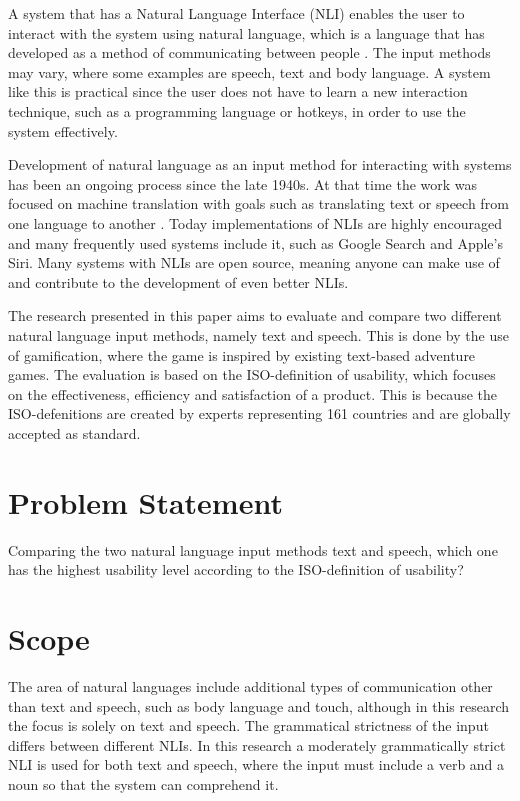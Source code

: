 A system that has a Natural Language Interface (NLI) enables the user to interact with the system using natural language, which is a language that has developed as a method of communicating between people \citep{NatLan}. The input methods may vary, where some examples are speech, text and body language. A system like this is practical since the user does not have to learn a new interaction technique, such as a programming language or hotkeys, in order to use the system effectively.

Development of natural language as an input method for interacting with systems has been an ongoing process since the late 1940s. At that time the work was focused on machine translation with goals such as translating text or speech from one language to another \citep{Jones}. Today implementations of NLIs are highly encouraged and many frequently used systems include it, such as Google Search and Apple's Siri. Many systems with NLIs are open source, meaning anyone can make use of and contribute to the development of even better NLIs.

The research presented in this paper aims to evaluate and compare two different natural language input methods, namely text and speech. This is done by the use of gamification, where the game is inspired by existing text-based adventure games. The evaluation is based on the ISO-definition of usability, which focuses on the effectiveness, efficiency and satisfaction of a product. \citep{ISO} This is because the ISO-defenitions are created by experts representing 161 countries and are globally accepted as standard.

\section{Problem Statement}
Comparing the two natural language input methods text and speech, which one has the highest usability level according to the ISO-definition of usability?

\section{Scope}
The area of natural languages include additional types of communication other than text and speech, such as body language and touch, although in this research the focus is solely on text and speech. The grammatical strictness of the input differs between different NLIs. In this research a moderately grammatically strict NLI is used for both text and speech, where the input must include a verb and a noun so that the system can comprehend it.

